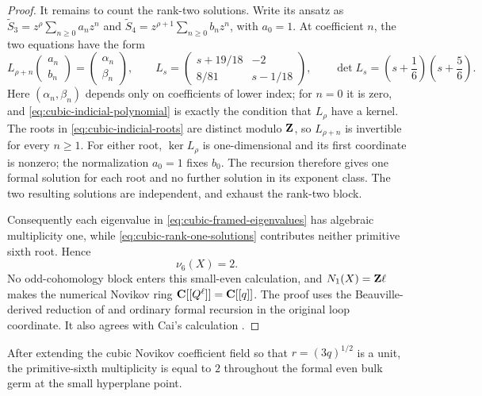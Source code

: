 \begin{proof}
It remains to count the rank-two solutions.  Write its ansatz as
\(\widetilde S_3=z^\rho\sum_{n\ge0}a_nz^n\) and
\(\widetilde S_4=z^{\rho+1}\sum_{n\ge0}b_nz^n\), with \(a_0=1\).
At coefficient \(n\), the two equations have the form
\[
 L_{\rho+n}\begin{pmatrix}a_n\\b_n\end{pmatrix}
 =\begin{pmatrix}\alpha_n\\\beta_n\end{pmatrix},
 \qquad
 L_s=
 \begin{pmatrix}
 s+19/18&-2\\
 8/81&s-1/18
 \end{pmatrix},
 \qquad
 \det L_s=\left(s+\frac16\right)\left(s+\frac56\right).
 \label{eq:cubic-frobenius-recursion}
\]
Here \((\alpha_n,\beta_n)\) depends only on coefficients of lower index;
for \(n=0\) it is zero, and \eqref{eq:cubic-indicial-polynomial} is exactly
the condition that \(L_\rho\) have a kernel.  The roots in
\eqref{eq:cubic-indicial-roots} are distinct modulo \(\mathbf Z\), so
\(L_{\rho+n}\) is invertible for every \(n\ge1\).  For either root,
\(\ker L_\rho\) is one-dimensional and its first coordinate is nonzero;
the normalization \(a_0=1\) fixes \(b_0\).  The recursion therefore gives
one formal solution for each root and no further solution in its exponent
class.  The two resulting solutions are independent, and exhaust the
rank-two block.

Consequently each eigenvalue in \eqref{eq:cubic-framed-eigenvalues} has
algebraic multiplicity one, while
\eqref{eq:cubic-rank-one-solutions} contributes neither primitive sixth root.
Hence
\[
 \nu_6(X)=2.
 \label{eq:cubic-packet-internal-count}
\]
No odd-cohomology block enters this small-even calculation, and
\(N_1(X)=\mathbf Z\ell\) makes the numerical Novikov ring
\(\mathbf C[[Q^\ell]]=\mathbf C[[q]]\).  The proof uses the Beauville-derived reduction of
\cite[Section~2]{RuddM1} and ordinary formal recursion in the original loop
coordinate.  It also agrees with Cai's calculation
\cite[pp.~5--6]{Cai}.

\end{proof}

\begin{corollary}
\label{cor:cubic-formal-germ}
%
%
After extending the cubic Novikov coefficient field so that
$r=(3q)^{1/2}$ is a unit, the primitive-sixth multiplicity is equal to $2$
throughout the formal even bulk germ at the small hyperplane point.
\end{corollary}

